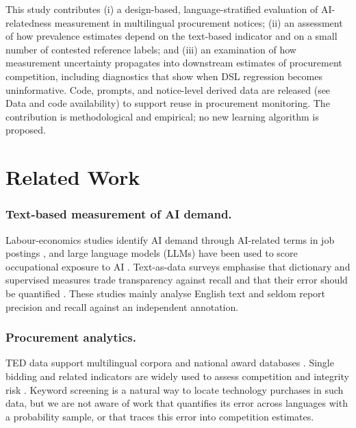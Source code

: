 \documentclass[runningheads]{llncs}
\begin{document}
This study contributes (i) a design-based, language-stratified evaluation of AI-relatedness measurement in multilingual procurement notices; (ii) an assessment of how prevalence estimates depend on the text-based indicator and on a small number of contested reference labels; and (iii) an examination of how measurement uncertainty propagates into downstream estimates of procurement competition, including diagnostics that show when DSL regression becomes uninformative. Code, prompts, and notice-level derived data are released (see Data and code availability)
to support reuse in procurement monitoring. The contribution is methodological and empirical; no new learning algorithm is proposed.

\section{Related Work}
\subsubsection{Text-based measurement of AI demand.} Labour-economics studies identify AI demand through AI-related terms in job postings \cite{acemoglu2022,babina2024}, and large language models (LLMs) have been used to score occupational exposure to AI \cite{eloundou2024}. Text-as-data surveys emphasise that dictionary and supervised measures trade transparency against recall and that their error should be quantified \cite{gentzkow2019}. These studies mainly analyse English text and seldom report precision and recall against an independent annotation.

\subsubsection{Procurement analytics.} TED data support multilingual corpora \cite{ahmia2018} and national award databases \cite{potin2023}. Single bidding and related indicators are widely used to assess competition and integrity risk \cite{fazekas2016,decarolis2022}. Keyword screening is a natural way to locate technology purchases in such data, but we are not aware of work that quantifies its error across languages with a probability sample, or that traces this error into competition estimates.
\end{document}
